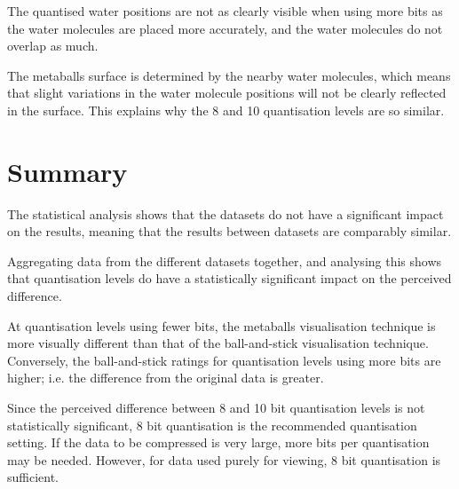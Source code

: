 The quantised water positions are not as clearly visible when using more bits
as the water molecules are placed more accurately, and the water molecules do
not overlap as much.

The metaballs surface is determined by the nearby water molecules, which means
that slight variations in the water molecule positions will not be clearly
reflected in the surface. This explains why the 8 and 10 quantisation levels
are so similar.



\section{Summary}
\label{sec:results_summary}

The statistical analysis shows that the datasets do not have a significant
impact on the results, meaning that the results between datasets are comparably
similar.

Aggregating data from the different datasets together, and analysing this shows
that quantisation levels do have a statistically significant impact on the
perceived difference.

At quantisation levels using fewer bits, the metaballs visualisation technique
is more visually different than that of the ball-and-stick visualisation
technique. Conversely, the ball-and-stick ratings for quantisation levels using
more bits are higher; i.e. the difference from the original data is greater.

Since the perceived difference between 8 and 10 bit quantisation levels is not
statistically significant, 8 bit quantisation is the recommended quantisation
setting. If the data to be compressed is very large, more bits per quantisation
may be needed. However, for data used purely for viewing, 8 bit quantisation is
sufficient.



